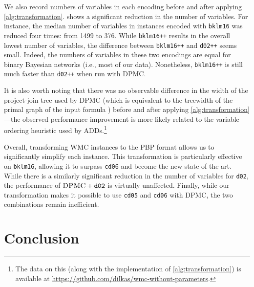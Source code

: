 We also record numbers of variables in each encoding before and after applying
\cref{alg:transformation}.  shows a significant reduction in the
number of variables. For instance, the median number of variables in instances
encoded with \texttt{bklm16} was reduced four times: from 1499 to 376. While
\texttt{bklm16++} results in the overall lowest number of variables, the
difference between \texttt{bklm16++} and \texttt{d02++} seems small. Indeed, the
numbers of variables in these two encodings are equal for binary Bayesian
networks (i.e., most of our data). Nonetheless, \texttt{bklm16++} is still much
faster than \texttt{d02++} when run with \textsc{DPMC}.

It is also worth noting that there was no observable difference in the width of
the project-join tree used by \textsc{DPMC} (which is equivalent to the
treewidth of the primal graph of the input formula
\citep{DBLP:conf/cp/DudekPV20}) before and after applying
\cref{alg:transformation}---the observed performance improvement is more likely
related to the variable ordering heuristic used by ADDs.\footnote{The data on
  this (along with the implementation of \cref{alg:transformation}) is available
  at \url{https://github.com/dilkas/wmc-without-parameters}.}

Overall, transforming WMC instances to the PBP format allows us to significantly
simplify each instance. This transformation is particularly effective on
\texttt{bklm16}, allowing it to surpass \texttt{cd06} and become the new state
of the art. While there is a similarly significant reduction in the number of
variables for \texttt{d02}, the performance of $\textsc{DPMC}+\texttt{d02}$ is
virtually unaffected. Finally, while our transformation makes it possible to use
\texttt{cd05} and \texttt{cd06} with \textsc{DPMC}, the two combinations remain
inefficient.

\section{Conclusion}


